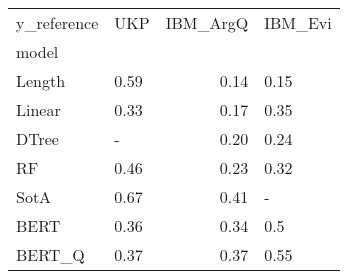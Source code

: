 \begin{tabular}{llrl}
\toprule
y\_reference &   UKP &  IBM\_ArgQ & IBM\_Evi \\
model  &       &           &         \\
\midrule
Length &  0.59 &      0.14 &    0.15 \\
Linear &  0.33 &      0.17 &    0.35 \\
DTree  &     - &      0.20 &    0.24 \\
RF     &  0.46 &      0.23 &    0.32 \\
SotA   &  0.67 &      0.41 &       - \\
BERT   &  0.36 &      0.34 &     0.5 \\
BERT\_Q &  0.37 &      0.37 &    0.55 \\
\bottomrule
\end{tabular}
